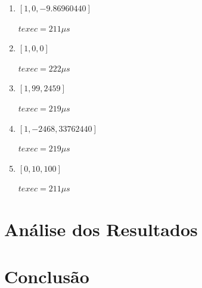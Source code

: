 \documentclass[12pt]{article}
\begin{document}
\begin{enumerate}[label={\alph*)}]

\item \([1, 0, -9.86960440]\)

	\(texec = 211 \mu s\)
\item \([1, 0, 0]\)

	\(texec = 222 \mu s\)
\item \([1, 99, 2459]\)

	\(texec = 219 \mu s\)
	
\item \([1, -2468, 33762440]\)

	\(texec = 219 \mu s\)
\item \([0, 10, 100]\)

	\(texec = 211 \mu s\)
\end{enumerate}




\section{Análise dos Resultados}
\label{sec:Resultados}

\section{Conclusão}
\label{sec:Conclusao}



\end{document}
